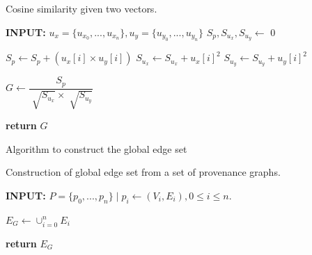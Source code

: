 







\begin{algorithm}
\caption{Cosine similarity given two vectors.}
 \label{alg:graph_similarity}
 
\begin{algorithmic}[1]

\State \textbf{INPUT: } $u_x=\{u_{x_0},...,u_{x_n}\},u_y=\{u_{y_0},...,u_{y_n}\}$
\State $S_p, S_{u_x}, S_{u_y} \gets$ 0

\State $S_p \gets S_p + (u_x[i] \times u_y[i])$
\State $ S_{u_x} \gets  S_{u_x} + u_x[i]^2$
\State $S_{u_y} \gets S_{u_y} + u_y[i]^2$

\EndFor

\State $G \gets \dfrac{S_p}{\sqrt[]{S_{u_x}} \times \sqrt[]{S_{u_y}} }$


\State \textbf{return} $G$

\EndProcedure

\end{algorithmic}

\end{algorithm}

\begin{algorithm}
\caption{Algorithm to construct the global edge set}

\begin{algorithmic}[1]  
\caption{Construction of global edge set from a set of provenance graphs.}
\label{graph_to_globaledgelist}

\State \textbf{INPUT: } $P=\{p_0,...,p_n\} \mid p_i\gets (V_i, E_i), 0 \leq i \leq n.$

\State $E_G \gets \cup_{i=0}^{n} E_i$

\State \textbf{return} $E_G$

\EndProcedure

\end{algorithmic}
\end{algorithm}


